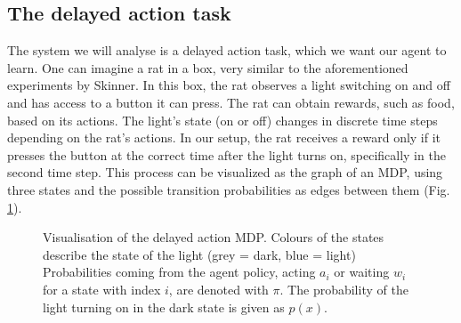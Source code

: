 \documentclass[12pt,a4paper]{article}
\begin{document}
\subsection{The delayed action task} \label{ssec:delayed_action_mdp}
The system we will analyse is a delayed action task, which we want our agent to learn.
One can imagine a rat in a box, very similar to the aforementioned experiments by Skinner.
In this box, the rat observes a light switching on and off and has access to a button it can press.
The rat can obtain rewards, such as food, based on its actions. The light's state (on or off) changes in discrete time steps depending on the rat's actions.
In our setup, the rat receives a reward only if it presses the button at the correct time after the light turns on, specifically in the second time step.
This process can be visualized as the graph of an MDP, using three states and the possible transition probabilities as edges between them (Fig. \ref{fig:delayed_mdp}).

\begin{figure}[H]
    \centering
    \caption{\label{fig:delayed_mdp} Visualisation of the delayed action MDP. Colours of the states describe the state of the light (grey = dark, blue = light) Probabilities coming from the agent policy, acting $a_i$ or waiting $w_i$ for a state with index $i$, are denoted with $\pi$. The probability of the light turning on in the dark state is given as $p(x)$.}
\end{figure}
\end{document}
